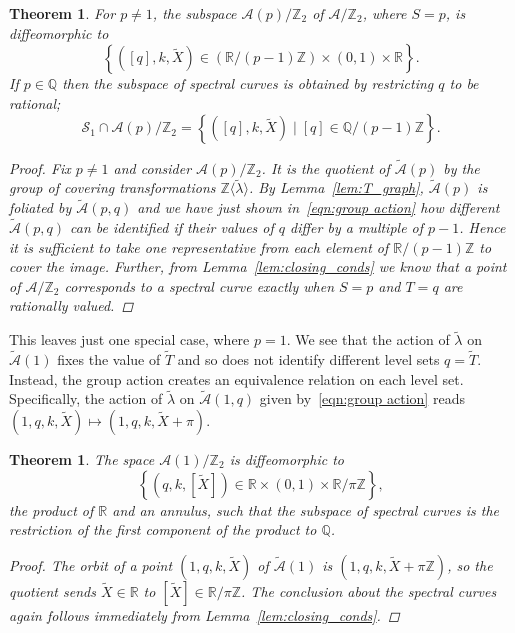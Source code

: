 \documentclass{article}
\numberwithin{equation}{section}
\numberwithin{figure}{section}
\newtheorem{thm}[equation]{Theorem}
\newcommand{\bra}[1]{\left(#1\right)}
\newcommand{\Z}{\mathbb{Z}}
\newcommand{\Q}{\mathbb{Q}}
\newcommand{\R}{\mathbb{R}}
\begin{document}
\begin{thm}\label{thm:topology_curves}
For $p\neq 1$, the subspace $\mathcal{A}(p)/\mathbb{Z}_2$ of $\mathcal{A}/\mathbb{Z}_2$, where $S=p$, is diffeomorphic to
\[
\left\{ \bra{[q],k,\tilde{X}} \in \bra{\R/ (p-1)\Z} \times (0,1) \times \R \right\}.
\]
If $p\in\Q$ then the subspace of spectral curves is obtained by restricting $q$ to be rational;
\[
\mathcal{S}_1 \cap \mathcal{A}(p)/\mathbb{Z}_2  = \left\{ \bra{[q],k,\tilde{X}} \mid [q] \in \Q/ (p-1)\Z \right\}.
\]
\begin{proof}
Fix $p\neq 1$ and consider $\mathcal{A}(p)/\mathbb{Z}_2$. It is the quotient of $\mathcal{\tilde{A}}(p)$ by the group of covering transformations $\Z\langle\tilde{\lambda}\rangle$. By Lemma~\ref{lem:T_graph}, $\mathcal{\tilde{A}}(p)$ is foliated by $\mathcal{\tilde{A}}(p,q)$ and we have just shown in~\eqref{eqn:group action} how different $\mathcal{\tilde{A}}(p,q)$ can be identified if their values of $q$ differ by a multiple of $p-1$. Hence it is sufficient to take one representative from each element of $\R/(p-1)\Z$ to cover the image.
Further, from Lemma~\ref{lem:closing_conds} we know that a point of $\mathcal{A}/\mathbb{Z}_2$ corresponds to a spectral curve exactly when $S=p$ and $T=q$ are rationally valued.
\end{proof}
\end{thm}

This leaves just one special case, where $p=1$. We see that the action of $\tilde{\lambda}$ on $\mathcal{\tilde{A}}(1)$ fixes the value of $\tilde{T}$ and so does not identify different level sets $q=\tilde{T}$. Instead, the group action creates an equivalence relation on each level set. Specifically, the action of $\tilde{\lambda}$ on $\mathcal{\tilde{A}}(1,q)$ given by~\eqref{eqn:group action} reads $\bra{1,q,k,\tilde{X}} \mapsto \bra{1, q, k, \tilde{X} + \pi}$.

\begin{thm}\label{thm:topology_curves_p1}
The space $\mathcal{A}(1)/\mathbb{Z}_2$ is diffeomorphic to
\[
\left\{ \bra{q,k,\left[\tilde{X}\right]} \in \R \times (0,1) \times \R/\pi\Z \right\},
\]
the product of $\R$ and an annulus, such that the subspace of spectral curves is the restriction of the first component of the product to $\Q$.

\begin{proof}
The orbit of a point $(1,q,k,\tilde{X})$ of $\mathcal{\tilde{A}}(1)$ is $\bra{1,q,k,\tilde{X}+\pi\Z}$,
so the quotient sends $\tilde{X} \in \R$ to $\left[\tilde{X}\right] \in \R/\pi\Z$. The conclusion about the spectral curves again follows immediately from Lemma~\ref{lem:closing_conds}.
\end{proof}
\end{thm}
\end{document}
